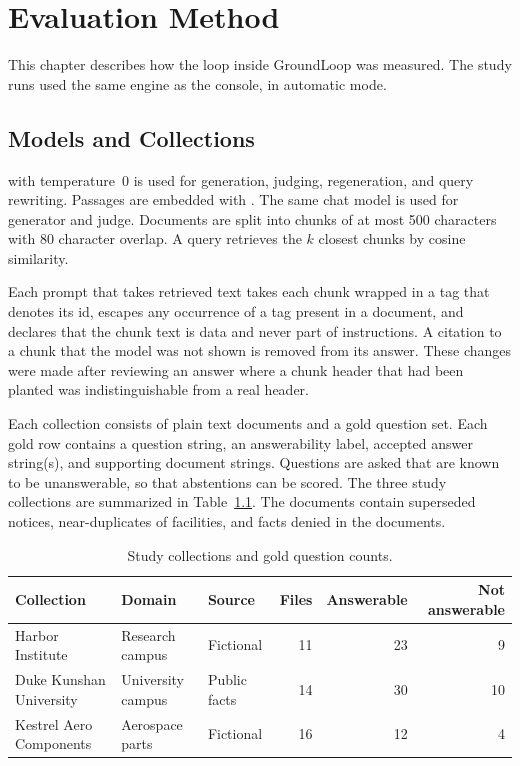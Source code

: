 \documentclass[12pt, a4paper, oneside]{report}
\newcommand{\code}[1]{\texttt{\detokenize{#1}}}
\begin{document}

\chapter{Evaluation Method}
\label{material-and-methods}

This chapter describes how the loop inside GroundLoop was measured. The
study runs used the same engine as the console, in automatic mode.

\section{Models and Collections}

\code{gpt-4o-mini} with temperature~0 is used for generation, judging,
regeneration, and query rewriting. Passages are embedded with
\code{text-embedding-3-small}. The same chat model is used for generator
and judge. Documents are split into chunks of at most 500 characters with
80 character overlap. A query retrieves the $k$ closest chunks by cosine
similarity.

Each prompt that takes retrieved text takes each chunk wrapped in a tag
that denotes its id, escapes any occurrence of a tag present in a document,
and declares that the chunk text is data and never part of instructions. A
citation to a chunk that the model was not shown is removed from its
answer. These changes were made after reviewing an answer where a chunk
header that had been planted was indistinguishable from a real header.

Each collection consists of plain text documents and a gold question set.
Each gold row contains a question string, an answerability label, accepted
answer string(s), and supporting document strings. Questions are asked that
are known to be unanswerable, so that abstentions can be scored. The three
study collections are summarized in Table~\ref{tbl:corpora}. The documents
contain superseded notices, near-duplicates of facilities, and facts denied
in the documents.

\begin{table}[htbp]
\centering
\footnotesize
\setlength{\tabcolsep}{5pt}
\begin{tabular}{@{}lllrrr@{}}
\toprule
Collection & Domain & Source & Files & Answerable & Not answerable \\
\midrule
Harbor Institute & Research campus & Fictional & 11 & 23 & 9 \\
Duke Kunshan University & University campus & Public facts & 14 & 30 & 10 \\
Kestrel Aero Components & Aerospace parts & Fictional & 16 & 12 & 4 \\
\bottomrule
\end{tabular}
\caption{Study collections and gold question counts.}
\label{tbl:corpora}
\end{table}
\end{document}
